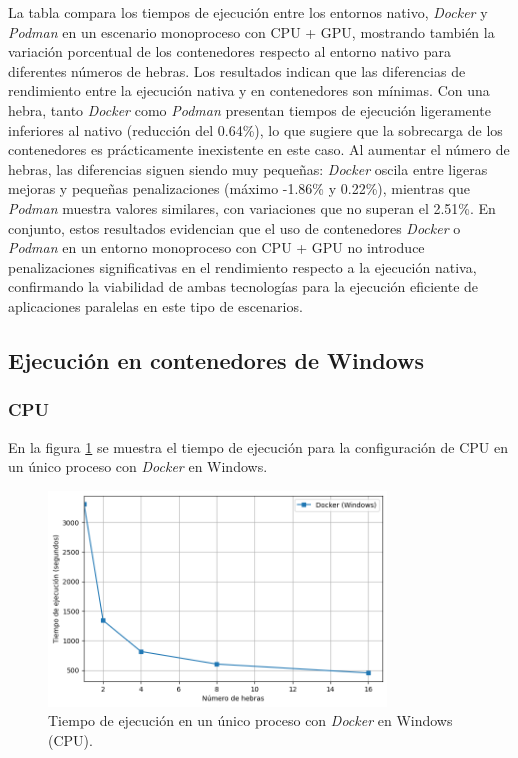 La tabla compara los tiempos de ejecución entre los entornos nativo, \textit{Docker} y \textit{Podman} en un escenario monoproceso con CPU + GPU, mostrando también la variación porcentual de los contenedores respecto al entorno nativo para diferentes números de hebras. Los resultados indican que las diferencias de rendimiento entre la ejecución nativa y en contenedores son mínimas. Con una hebra, tanto \textit{Docker} como \textit{Podman} presentan tiempos de ejecución ligeramente inferiores al nativo (reducción del 0.64\%), lo que sugiere que la sobrecarga de los contenedores es prácticamente inexistente en este caso. Al aumentar el número de hebras, las diferencias siguen siendo muy pequeñas: \textit{Docker} oscila entre ligeras mejoras y pequeñas penalizaciones (máximo -1.86\% y 0.22\%), mientras que \textit{Podman} muestra valores similares, con variaciones que no superan el 2.51\%. En conjunto, estos resultados evidencian que el uso de contenedores \textit{Docker} o \textit{Podman} en un entorno monoproceso con CPU + GPU no introduce penalizaciones significativas en el rendimiento respecto a la ejecución nativa, confirmando la viabilidad de ambas tecnologías para la ejecución eficiente de aplicaciones paralelas en este tipo de escenarios.

\subsection{Ejecución en contenedores de Windows}
\subsubsection{CPU}

En la figura \ref{fig:single-node_windows_docker_time} se muestra el tiempo de ejecución para la configuración de CPU en un único proceso con \textit{Docker} en Windows.

\begin{figure}[ht]
    \centering
    \includegraphics[width=0.8\textwidth]{imagenes/cap5/single-node_windows_docker_time.png}
    \caption{Tiempo de ejecución en un único proceso con \textit{Docker} en Windows (CPU).}
    \label{fig:single-node_windows_docker_time}
\end{figure}

